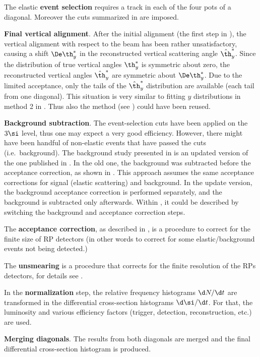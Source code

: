 \> The elastic {\bf event selection} requires a track in each of the four pots of a diagonal. Moreover the cuts summarized in  are imposed.

\> {\bf Final vertical alignment}. After the initial alignment (the first step in ), the vertical alignment with respect to the beam has been rather unsatisfactory, causing a shift $\De\th_y^*$ in the reconstructed vertical scattering angle $\hat \th_y^*$. Since the distribution of true vertical angles $\th_y^*$ is symmetric about zero, the reconstructed vertical angles $\hat\th_y^*$ are symmetric about $\De\th_y^*$. Due to the limited acceptance, only the tails of the $\hat\th_y^*$ distribution are available (each tail from one diagonal). This situation is very similar to fitting $y$ distributions in method 2 in . Thus also the method (see ) could have been reused.

\> {\bf Background subtraction}. The event-selection cuts have been applied on the $3\si$ level, thus one may expect a very good efficiency. However, there might have been handful of non-elastic events that have passed the cuts (i.e.~background). The background study presented in  is an updated version of the one published in . In the old one, the background was subtracted before the acceptance correction, as shown in . This approach assumes the same acceptance corrections for signal (elastic scattering) and background. In the update version, the background acceptance correction is performed separately, and the background is subtracted only afterwards. Within , it could be described by switching the background and acceptance correction steps.

\> The {\bf acceptance correction}, as described in , is a procedure to correct for the finite size of RP detectors (in other words to correct for some elastic/background events not being detected.)

\> The {\bf unsmearing} is a procedure that corrects for the finite resolution of the RPs detectors, for details see .

\> In the {\bf normalization} step, the relative frequency histograms $\d N/\d t$ are transformed in the differential cross-section histograms $\d\si/\d t$. For that, the luminosity and various efficiency factors (trigger, detection, reconstruction, etc.) are used.

\> {\bf Merging diagonals}. The results from both diagonals are merged and the final differential cross-section histogram is produced.





